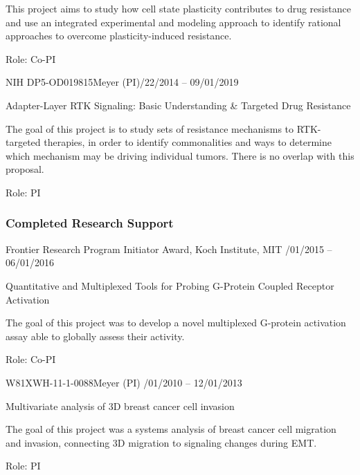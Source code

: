 \documentclass[11pt]{article}
\begin{document}
This project aims to study how cell state plasticity contributes to drug resistance and use an integrated experimental and modeling approach to identify rational approaches to overcome plasticity-induced resistance.

Role: Co-PI

\vspace{12pt}

NIH DP5-OD019815\tab  Meyer (PI)/22/2014 -- 09/01/2019

Adapter-Layer RTK Signaling: Basic Understanding \& Targeted Drug Resistance

The goal of this project is to study sets of resistance mechanisms to RTK-targeted therapies, in order to identify commonalities and ways to determine which mechanism may be driving individual tumors. There is no overlap with this proposal.

Role: PI

\subsubsection{Completed Research Support}

Frontier Research Program Initiator Award, Koch Institute, MIT /01/2015 -- 06/01/2016

Quantitative and Multiplexed Tools for Probing G-Protein Coupled Receptor Activation

The goal of this project was to develop a novel multiplexed G-protein activation assay able to globally assess their activity.

Role: Co-PI

\vspace{12pt}



W81XWH-11-1-0088\tab Meyer (PI) /01/2010 -- 12/01/2013

Multivariate analysis of 3D breast cancer cell invasion

The goal of this project was a systems analysis of breast cancer cell migration and invasion, connecting 3D migration to signaling changes during EMT.

Role: PI
\end{document}
